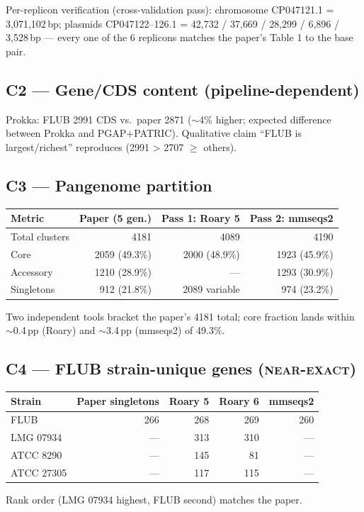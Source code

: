 \documentclass[11pt,letterpaper]{article}
\begin{document}
Per-replicon verification (cross-validation pass): chromosome CP047121.1 = 3{,}071{,}102\,bp; plasmids CP047122--126.1 = 42{,}732 / 37{,}669 / 28{,}299 / 6{,}896 / 3{,}528\,bp --- every one of the 6 replicons matches the paper's Table 1 to the base pair.

\subsection{C2 --- Gene/CDS content (pipeline-dependent)}
Prokka: FLUB 2991 CDS vs.\ paper 2871 ($\sim$4\% higher; expected difference between Prokka and PGAP+PATRIC). Qualitative claim ``FLUB is largest/richest'' reproduces (2991 > 2707 $\ge$ others).

\subsection{C3 --- Pangenome partition}
\begin{center}\small
\begin{tabular}{lrrr}
\toprule
Metric & Paper (5 gen.) & Pass 1: Roary 5 & Pass 2: mmseqs2 \\
\midrule
Total clusters & 4181 & 4089 & 4190 \\
Core & 2059 (49.3\%) & 2000 (48.9\%) & 1923 (45.9\%) \\
Accessory & 1210 (28.9\%) & --- & 1293 (30.9\%) \\
Singletons & 912 (21.8\%) & 2089 variable & 974 (23.2\%) \\
\bottomrule
\end{tabular}
\end{center}
Two independent tools bracket the paper's 4181 total; core fraction lands within $\sim$0.4\,pp (Roary) and $\sim$3.4\,pp (mmseqs2) of 49.3\%.

\subsection{C4 --- FLUB strain-unique genes (\textsc{near-exact})}
\begin{center}\small
\begin{tabular}{lrrrr}
\toprule
Strain & Paper singletons & Roary 5 & Roary 6 & mmseqs2 \\
\midrule
FLUB & 266 & 268 & 269 & 260 \\
LMG 07934 & --- & 313 & 310 & --- \\
ATCC 8290 & --- & 145 & 81 & --- \\
ATCC 27305 & --- & 117 & 115 & --- \\
\bottomrule
\end{tabular}
\end{center}
Rank order (LMG 07934 highest, FLUB second) matches the paper.
\end{document}
